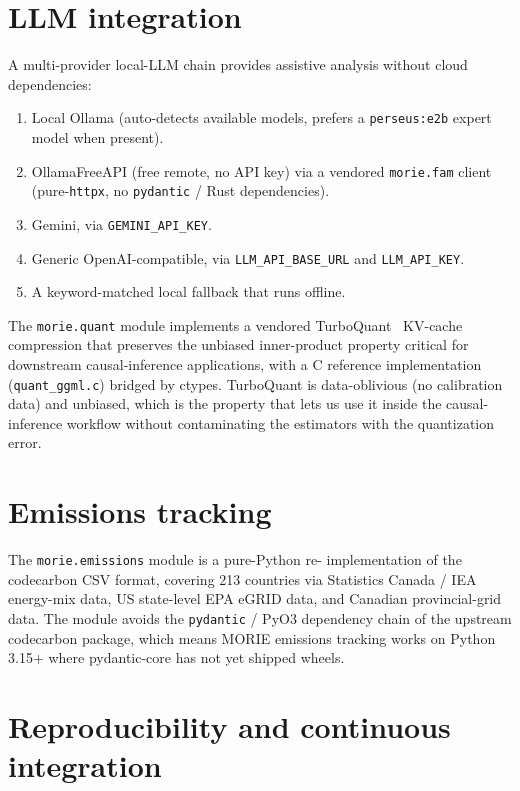 \documentclass[11pt,a4paper]{article}
\theoremstyle{plain}
\theoremstyle{definition}
\theoremstyle{remark}
\begin{document}
\section{LLM integration}
\label{sec:llm}

A multi-provider local-LLM chain provides assistive analysis
without cloud dependencies:

\begin{enumerate}
\item Local Ollama (auto-detects available models, prefers a
      \texttt{perseus:e2b} expert model when present).
\item OllamaFreeAPI (free remote, no API key) via a vendored
      \texttt{morie.fam} client (pure-\texttt{httpx}, no
      \texttt{pydantic} / Rust dependencies).
\item Gemini, via \texttt{GEMINI\_API\_KEY}.
\item Generic OpenAI-compatible, via \texttt{LLM\_API\_BASE\_URL}
      and \texttt{LLM\_API\_KEY}.
\item A keyword-matched local fallback that runs offline.
\end{enumerate}

The \texttt{morie.quant} module implements a vendored
TurboQuant~\cite{Zandieh2026TurboQuant} KV-cache compression that
preserves the unbiased inner-product property critical for
downstream causal-inference applications, with a C reference
implementation (\texttt{quant\_ggml.c}) bridged by ctypes.
TurboQuant is data-oblivious (no calibration data) and unbiased,
which is the property that lets us use it inside the causal-
inference workflow without contaminating the estimators with the
quantization error.

\section{Emissions tracking}

The \texttt{morie.emissions} module is a pure-Python re-
implementation of the codecarbon CSV format, covering 213
countries via Statistics Canada / IEA energy-mix data, US
state-level EPA eGRID data, and Canadian provincial-grid data.
The module avoids the \texttt{pydantic} / PyO3 dependency chain
of the upstream codecarbon package, which means MORIE
emissions tracking works on Python 3.15+ where pydantic-core has
not yet shipped wheels.

\section{Reproducibility and continuous integration}
\end{document}
